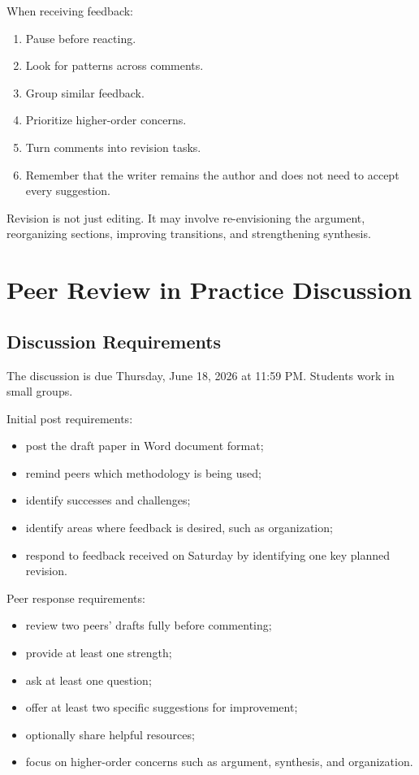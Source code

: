 \documentclass[10pt,letterpaper]{article}
\begin{document}
When receiving feedback:

\begin{enumerate}
\item Pause before reacting.
\item Look for patterns across comments.
\item Group similar feedback.
\item Prioritize higher-order concerns.
\item Turn comments into revision tasks.
\item Remember that the writer remains the author and does not need to accept every suggestion.
\end{enumerate}

Revision is not just editing. It may involve re-envisioning the argument, reorganizing sections, improving transitions, and strengthening synthesis.

\section{Peer Review in Practice Discussion}

\subsection{Discussion Requirements}

The discussion is due Thursday, June 18, 2026 at 11:59 PM. Students work in small groups.

Initial post requirements:

\begin{itemize}
\item post the draft paper in Word document format;
\item remind peers which methodology is being used;
\item identify successes and challenges;
\item identify areas where feedback is desired, such as organization;
\item respond to feedback received on Saturday by identifying one key planned revision.
\end{itemize}

Peer response requirements:

\begin{itemize}
\item review two peers' drafts fully before commenting;
\item provide at least one strength;
\item ask at least one question;
\item offer at least two specific suggestions for improvement;
\item optionally share helpful resources;
\item focus on higher-order concerns such as argument, synthesis, and organization.
\end{itemize}
\end{document}

